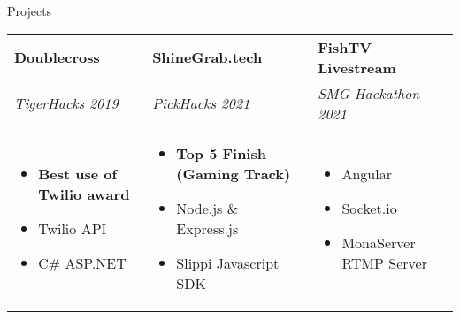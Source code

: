 \documentclass{resume}
\begin{document}
\begin{rSection}{Projects}
    \small
    {
        \begin{tabular}{p{} p{} p{} }%
            \textbf{Doublecross} & 
            \textbf{ShineGrab.tech}  & \textbf{FishTV Livestream}\\
            \textit{TigerHacks 2019} 
            & \textit{PickHacks 2021} & \textit{SMG Hackathon 2021} \\
            \begin{itemize}
              \item \textbf{Best use of Twilio award}
              \item Twilio API
              \item C\# ASP.NET
            \end{itemize} &
            \begin{itemize}
              \item \textbf{Top 5 Finish (Gaming Track)}
              \item Node.js \& Express.js
              \item Slippi Javascript SDK
          \end{itemize} &
            \begin{itemize}
                \item Angular
                \item Socket.io
                \item MonaServer RTMP Server
            \end{itemize}
        \end{tabular}
    }
\end{rSection}



\end{document}
